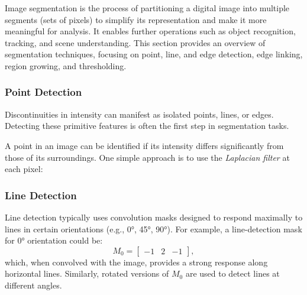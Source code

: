 \documentclass[a4paper,12pt]{article}
\begin{document}
Image segmentation is the process of partitioning a digital image into multiple segments (sets of pixels) to simplify its representation and make it more meaningful for analysis. It enables further operations such as object recognition, tracking, and scene understanding. This section provides an overview of segmentation techniques, focusing on point, line, and edge detection, edge linking, region growing, and thresholding.


\subsubsection{Point Detection}

Discontinuities in intensity can manifest as isolated points, lines, or edges. Detecting these primitive features is often the first step in segmentation tasks.

A point in an image can be identified if its intensity differs significantly from those of its surroundings. One simple approach is to use the \emph{Laplacian filter} at each pixel:

\subsubsection{Line Detection}

Line detection typically uses convolution masks designed to respond maximally to lines in certain orientations (e.g., 0°, 45°, 90°). For example, a line-detection mask for 0° orientation could be:
\[
M_0 = 
\begin{bmatrix}
-1 & 2 & -1
\end{bmatrix},
\]
which, when convolved with the image, provides a strong response along horizontal lines. Similarly, rotated versions of \(M_0\) are used to detect lines at different angles.
\end{document}
